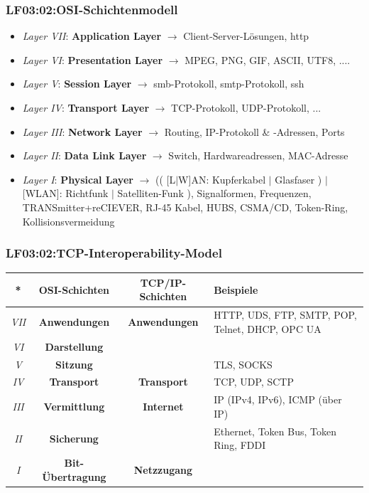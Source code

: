 \begin{frame}
  \frametitle{LF03:02:OSI-Schichtenmodell}
	\begin{itemize}
		\item \textit{Layer VII}: \textbf{Application Layer} $\rightarrow$ Client-Server-Lösungen, http
		\item \textit{Layer VI}: \textbf{Presentation Layer} $\rightarrow$ MPEG, PNG, GIF, ASCII, UTF8, ....
		\item \textit{Layer V}: \textbf{Session Layer} $\rightarrow$ smb-Protokoll, smtp-Protokoll, ssh 
		\item \textit{Layer IV}: \textbf{Transport Layer} $\rightarrow$ TCP-Protokoll, UDP-Protokoll, ...
		\item \textit{Layer III}: \textbf{Network Layer} $\rightarrow$ Routing, IP-Protokoll \& -Adressen, Ports
		\item \textit{Layer II}: \textbf{Data Link Layer} $\rightarrow$ Switch, Hardwareadressen, MAC-Adresse
		\item \textit{Layer I}: \textbf{Physical Layer} $\rightarrow$ (( [L$|$W]AN: Kupferkabel $|$ Glasfaser )  $|$ [WLAN]: Richtfunk $|$ Satelliten-Funk ), Signalformen, Frequenzen, TRANSmitter+reCIEVER, RJ-45 Kabel, HUBS, CSMA/CD, Token-Ring, Kollisionsvermeidung
	\end{itemize}
\end{frame}

\begin{frame}
  \frametitle{LF03:02:TCP-Interoperability-Model}

  \begin{footnotesize}
    \begin{tabularx}{\textwidth}{|c|c|c|X|}
      * & OSI-Schichten & TCP/IP-Schichten & Beispiele \\
      \hline
      \hline
      \textit{VII} & \textbf{Anwendungen} & \textbf{Anwendungen} & HTTP, UDS, FTP, SMTP, POP, Telnet, DHCP, OPC UA \\
      \textit{VI} & \textbf{Darstellung} & & \\
      \textit{V} & \textbf{Sitzung} & & TLS, SOCKS \\
      \hline
      \textit{IV} & \textbf{Transport} & \textbf{Transport} & TCP, UDP, SCTP \\
      \hline
      \textit{III} & \textbf{Vermittlung} & \textbf{Internet} & IP (IPv4, IPv6), ICMP (über IP) \\
      \hline
      \textit{II} & \textbf{Sicherung} & & Ethernet, Token Bus, Token Ring, FDDI \\
      \textit{I} & \textbf{Bit-Übertragung} & \textbf{Netzzugang} & \\
      \hline
      \hline
  
    \end{tabularx}
  \end{footnotesize}
\end{frame}

